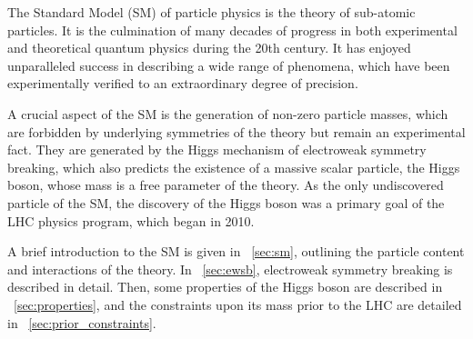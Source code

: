 
The Standard Model (SM) of particle physics is the theory of sub-atomic particles.
It is the culmination of many decades of progress in both experimental and theoretical
quantum physics during the 20th century. It has enjoyed unparalleled success in describing 
a wide range of phenomena, which have been experimentally verified to an extraordinary 
degree of precision.

A crucial aspect of the SM is the generation of non-zero particle masses, which are 
forbidden by underlying symmetries of the theory but remain an experimental fact. 
They are generated by 
the Higgs mechanism of electroweak symmetry breaking, which also predicts the existence of 
a massive scalar particle, the Higgs boson, whose mass is a free parameter of the theory. 
As the only undiscovered particle of the SM, the discovery of the Higgs boson was 
a primary goal of the LHC physics program, which began in 2010.

A brief introduction to the SM is given in \Section~\ref{sec:sm}, outlining the 
particle content and interactions of the theory. In \Section~\ref{sec:ewsb}, electroweak 
symmetry breaking is described in detail. Then, some properties of the Higgs boson are 
described in \Section~\ref{sec:properties}, and the constraints upon its mass prior to the 
LHC are detailed in \Section~\ref{sec:prior_constraints}.
